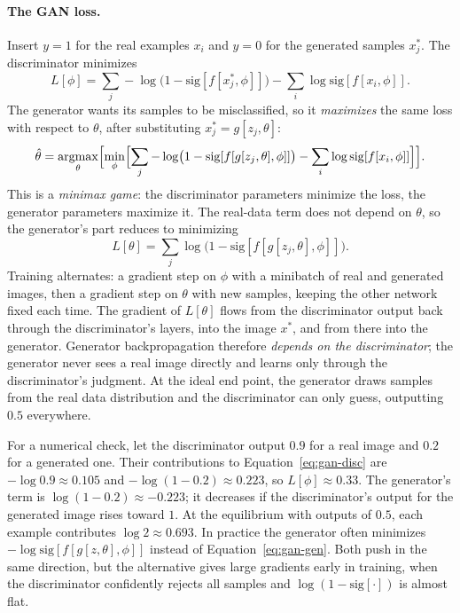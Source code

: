 \paragraph{The GAN loss.}
Insert $y=1$ for the real examples $x_i$ and $y=0$ for the generated samples
$x_j^*$. The discriminator minimizes
\begin{equation}
  L[\phi] = \sum_j -\log\bigl(1-\mathrm{sig}[f[x_j^*,\phi]]\bigr)
            - \sum_i \log\mathrm{sig}[f[x_i,\phi]] .
  \label{eq:gan-disc}
\end{equation}
\noindent
The generator wants its samples to be misclassified, so it \emph{maximizes} the
same loss with respect to $\theta$, after substituting $x_j^* =
g[z_j,\theta]$:
\begin{equation}
  \hat\theta = \operatorname*{argmax}_{\theta}\Bigl[\min_{\phi}\Bigl[
    \sum_j -\log\bigl(1-\mathrm{sig}[f[g[z_j,\theta],\phi]]\bigr)
    - \sum_i \log\mathrm{sig}[f[x_i,\phi]]\Bigr]\Bigr].
  \label{eq:gan-minimax}
\end{equation}
\noindent
This is a \emph{minimax game}: the discriminator parameters minimize the loss,
the generator parameters maximize it. The real-data term does not depend on
$\theta$, so the generator's part reduces to minimizing
\begin{equation}
  L[\theta] = \sum_j \log\bigl(1-\mathrm{sig}[f[g[z_j,\theta],\phi]]\bigr).
  \label{eq:gan-gen}
\end{equation}
\noindent
Training alternates: a gradient step on $\phi$ with a minibatch of real and
generated images, then a gradient step on $\theta$ with new samples, keeping
the other network fixed each time. The gradient of $L[\theta]$ flows from the
discriminator output back through the discriminator's layers, into the image
$x^*$, and from there into the generator. Generator backpropagation therefore
\emph{depends on the discriminator}; the generator never sees a real image
directly and learns only through the discriminator's judgment. At the ideal
end point, the generator draws samples from the real data distribution and the
discriminator can only guess, outputting $0.5$ everywhere.

For a numerical check, let the discriminator output $0.9$ for a real image and
$0.2$ for a generated one. Their contributions to Equation~\ref{eq:gan-disc}
are $-\log 0.9\approx0.105$ and $-\log(1-0.2)\approx0.223$, so
$L[\phi]\approx0.33$. The generator's term is $\log(1-0.2)\approx-0.223$; it
decreases if the discriminator's output for the generated image rises toward
$1$. At the equilibrium with outputs of $0.5$, each example contributes
$\log 2\approx0.693$. In practice the generator often minimizes
$-\log\mathrm{sig}[f[g[z,\theta],\phi]]$ instead of
Equation~\ref{eq:gan-gen}. Both push in the same direction, but the
alternative gives large gradients early in training, when the discriminator
confidently rejects all samples and $\log(1-\mathrm{sig}[\cdot])$ is almost
flat.

